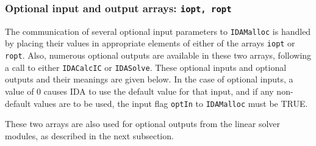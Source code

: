 \subsubsection{Optional input and output arrays: {\tt iopt, ropt}}

The communication of several optional input parameters to 
{\tt IDAMalloc} is handled by placing their values in appropriate
elements of either of the arrays {\tt iopt} or {\tt ropt}.  Also,
numerous optional outputs are available in these two arrays, following
a call to either {\tt IDACalcIC} or {\tt IDASolve}.  These optional
inputs and optional outputs and their meanings are given below.  
In the case of optional inputs, a value of 0 causes IDA to use the
default value for that input, and if any non-default values are to be
used, the input flag {\tt optIn} to {\tt IDAMalloc} must be TRUE.

These two arrays are also used for optional outputs from the linear
solver modules, as described in the next subsection.

